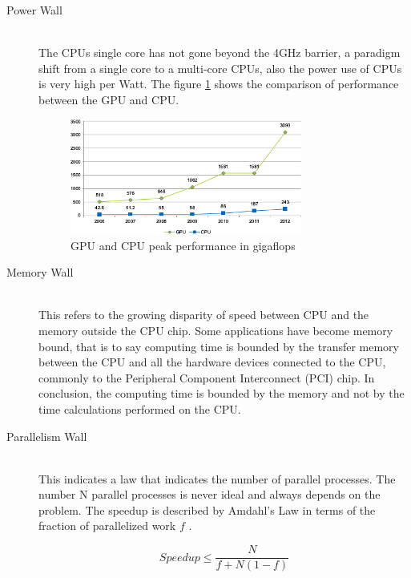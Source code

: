 \begin{description}
  \item[Power Wall] \hfill \\
  The CPUs single core has not gone beyond the 4GHz barrier, a paradigm shift from a single core to a multi-core CPUs, also  the power use of CPUs is very high per Watt. The figure \ref{fig:gpu_cpu_s} shows the comparison of performance between the GPU and CPU.

\begin{figure}[htbp]
	\centering
		\includegraphics[width=0.75\textwidth]{Figures/GPU_CPU_s.png}
		\smallskip
	\caption[GPU and CPU]{GPU and CPU peak performance in gigaflops}
	\label{fig:gpu_cpu_s}
\end{figure}


  \item[Memory Wall] \hfill \\
  This refers to the growing disparity of speed between CPU  and the memory outside the CPU chip. Some applications have become memory bound, that is to say computing time is bounded by the transfer memory between the CPU and all the hardware devices connected to the CPU, commonly to the Peripheral Component Interconnect (PCI) chip. In conclusion, the computing time is bounded by the memory and not by the time calculations performed on the CPU.

  \item[Parallelism Wall] \hfill \\
  This indicates a law that indicates the number of parallel processes. The number N parallel processes is never ideal and always depends on the problem.  The speedup is described by Amdahl's Law in terms of the fraction of parallelized work $f$ \cite{quantitative}.

  $$Speedup \leq \frac{N}{f + N(1-f)}$$


\end{description}

